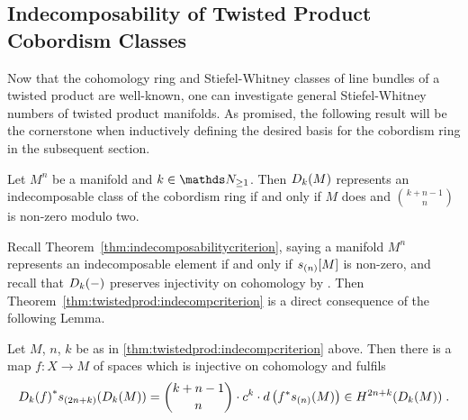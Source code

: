 \subsection{Indecomposability of Twisted Product Cobordism Classes}
\label{sec:twistedprod:indecompcriterion}
Now that the cohomology ring and Stiefel-Whitney classes of line
bundles of a twisted product are well-known, one can investigate
general Stiefel-Whitney numbers of twisted product manifolds.
As promised, the following result will be the cornerstone when inductively
defining the desired basis for the cobordism ring in the subsequent section.
\begin{Thm}\label{thm:twistedprod:indecompcriterion}
  Let $M^n$ be a manifold and $k\in\Nat_{\geq1}$.
  Then $D_{k}({M})$ represents an indecomposable class of the
  cobordism ring if and only if $M$ does and $\binom{k+n-1}{n}$ is
  non-zero modulo two.
\end{Thm}
Recall Theorem~\autoref{thm:indecomposabilitycriterion}, saying
a manifold $M^n$ represents an indecomposable element if and only if
$s_{(n)}[M]$ is non-zero,
and recall that $D_{k}({-})$ preserves injectivity on
cohomology by
.
Then Theorem~\autoref{thm:twistedprod:indecompcriterion} is a
direct consequence of the following Lemma.
\begin{Lem}\label{lem:twistedprod:indecompcriterion}
  Let $M$, $n$, $k$ be as in
  \autoref{thm:twistedprod:indecompcriterion} above.
  Then there is a map $f\colon X\to M$ of spaces which is injective on
  cohomology and fulfils
  \begin{gather*}
    {D_{k}({f})}^* s_{(2n+k)}(D_{k}({M}))
    = \binom{k+n-1}{n} \cdot c^k
    \cdot d\left( {f}^* s_{(n)}(M) \right)
    \in H^{2n+k}(D_{k}({M}))
    \;.
  \end{gather*}
\end{Lem}
